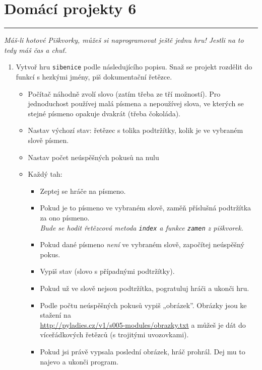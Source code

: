 \documentclass[a4paper,10pt]{article}
\newcommand\plsetno{6}
\newcommand\startsection[1]{
     \vspace{0.2ex}
    \hrule
    {\fontspec{Oxygen} \tiny
     \vspace{-1ex}
     \emph{#1}
     \vspace{-1.5em}
    }
}
\begin{document}
\section*{Domácí projekty \plsetno}

\startsection{Máš-li hotové Piškvorky, můžeš si naprogramovat ještě jednu hru! Jestli na to tedy máš čas a chuť.}

\begin{enumerate}[resume]

\item Vytvoř hru \texttt{sibenice} podle následujícího popisu.
    Snaž se projekt rozdělit do funkcí s hezkými jmény, piš dokumentační řetězce.

    \begin{itemize}
        \item Počítač náhodně zvolí slovo (zatím třeba ze tří možností).
            Pro jednoduchost používej malá písmena a nepoužívej slova,
            ve kterých se stejné písmeno opakuje dvakrát
            (třeba č\textcolor{plpink}{o}k\textcolor{plpink}{o}láda).
        \item Nastav výchozí stav: řetězec s tolika podtržítky, kolik je
             ve vybraném slově písmen.
        \item Nastav počet neúspěšných pokusů na nulu
        \item Každý tah:
            \begin{itemize}
                \item Zeptej se hráče na písmeno.
                \item Pokud je to písmeno ve vybraném slově, zaměň příslušná
                    podtržítka za ono písmeno.
                    \\\emph{\small Bude se hodit řetězcová metoda \texttt{index}
                    a funkce \texttt{zamen} z piškvorek.}
                \item Pokud dané písmeno \emph{není} ve vybraném slově,
                    započítej neúspěšný pokus.
                \item Vypiš stav (slovo s případnými podtržítky).
                \item Pokud už ve slově nejsou podtržítka, pogratuluj hráči
                    a ukonči hru.
                \item Podle počtu neúspěšných pokusů vypiš „obrázek”.
                    Obrázky jsou ke stažení na \\\url{http://pyladies.cz/v1/s005-modules/obrazky.txt}
                    a můžeš je dát do víceřádkových řetězců (s trojitými uvozovkami).
                \item Pokud jsi právě vypsala poslední obrázek, hráč prohrál.
                    Dej mu to najevo a ukonči program.
            \end{itemize}
    \end{itemize}


\end{enumerate}
\end{document}
